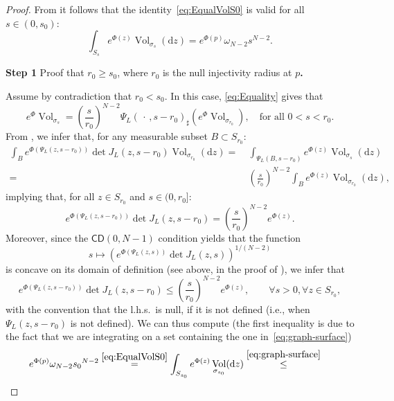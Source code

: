 \documentclass[12pt,a4paper]{amsart}
\theoremstyle{plain}
\theoremstyle{definition}
\numberwithin{equation}{section}
\DeclareMathOperator{\vol}{Vol}
\newcommand{\de}{{\mathrm{d}}}
\newcommand{\CD}{\mathsf{CD}}
\newcommand{\dotargument}{\,\cdot\,}
\newcommand{\gflow}{\Psi}
\begin{document}
\begin{proof}
From   it follows that the identity~\eqref{eq:EqualVolS0} is valid for all $s \in (0, s_0)$: 
%
\begin{equation}\label{eq:Equality}
\int_{S_{s}}e^{\Phi(z)}
\vol_{\sigma_{s}}(\de z)
= 
e^{\Phi(p)}\omega_{N-2}s^{N-2}.
\end{equation}
%

\noindent
\textbf{Step 1} Proof that $r_0\geq s_0$, where
$r_0$ is the null injectivity radius at $p$\textbf{.}

\noindent
  Assume by contradiction that $r_0<s_0$.
  In this case, \eqref{eq:Equality} gives that
  $$
e^{\Phi}
\vol_{\sigma_{s}} 
= 
\left( \frac{s }{r_0 }\right)^{N-2} \Psi_L(\dotargument, 
s-r_0)_\sharp \left( e^{\Phi}
\vol_{\sigma_{r_0}} \right), \quad \text{for all $0<s< r_0$.}
$$
From , we infer that,
for any measurable subset $B \subset S_{r_0}$: 
%
\begin{align*}
\int_B e^{\Phi(\Psi_L(z,s- r_0))} \det J_L(z,s-r_0) 
\vol_{\sigma_{r_0}}(\de z) 
= &~
\int_{\Psi_L(B,s-r_0)} e^{\Phi(z)}
\vol_{\sigma_{s}}(\de z) \\
= &~\left( \frac{s }{r_0 }\right)^{N-2}
\int_B e^{\Phi(z)} \vol_{\sigma_{r_0}}(\de z),
\end{align*}
%
implying that, for all $z\in S_{r_0}$ and $s \in (0,r_0]$: 
%
\begin{equation}\label{E:rigid}
e^{\Phi(\Psi_L(z,s- r_0))} \det J_L(z,s-r_0) = 
\left(\frac{s}{r_0}\right)^{N-2}e^{\Phi(z)}.
\end{equation}
%
Moreover, since the $\CD(0,N-1)$ condition  yields that the function $$s\mapsto
(e^{\Phi(\Psi_L(z,s))} \det J_L(z,s))^{1/(N-2)}$$ is concave on its domain of
definition (see above, in the proof
of ), we infer that
\begin{equation}
  \label{eq:quasi-rigid}
e^{\Phi(\Psi_L(z,s- r_0))} \det J_L(z,s-r_0) \leq
\left(\frac{s}{r_0}\right)^{N-2}e^{\Phi(z)},
\qquad
\forall s>0,
\forall z\in S_{r_0}
,
\end{equation}
with the convention that the l.h.s.\ is null, if it is not defined
(i.e., when  $\gflow_L(z,s-r_0)$ is not defined).
%
We can thus compute (the first inequality is due to the fact that
we are integrating
on a set containing the one in~\eqref{eq:graph-surface})
\begin{align*}
  e^{\Phi(p)}\omega_{N-2}{s_0}^{N-2}
  &
 \overset{\eqref{eq:EqualVolS0}}{=}
  \int_{S_{s_0}}
  e^{\Phi(z)}
  \vol_{\sigma_{s_0}}(\de z)
 \overset{\eqref{eq:graph-surface}}{\leq}

\end{align*}
\end{proof}
\end{document}
